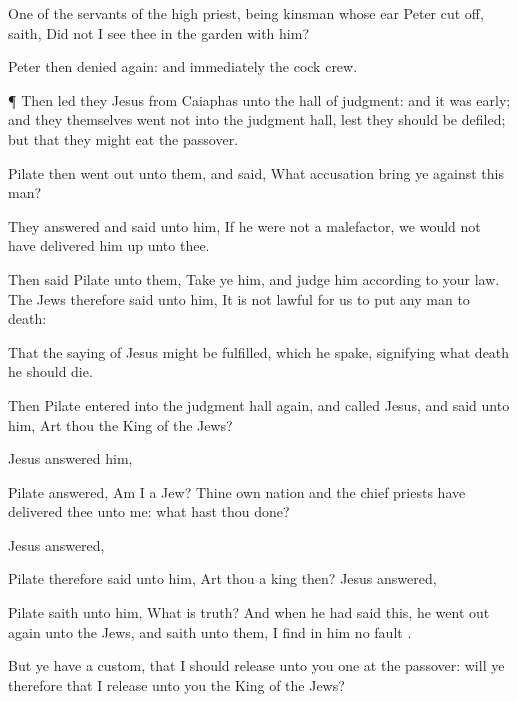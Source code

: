 {One
of the
servants of the high
priest,
being
{}
kinsman
whose
ear
Peter cut
off,
saith,
Did
not
I
see
thee
in the
garden
with
him?

Peter
then
denied
again:
and
immediately the
cock
crew.


\par }{\PP {}¶
Then led
they
Jesus
from
Caiaphas
unto the hall of
judgment:
and it
was
early;
and
they
themselves
went
not
into the judgment
hall,
lest they should be
defiled;
but
that they might
eat the
passover.

Pilate
then went
out
unto
them,
and
said,
What
accusation bring
ye
against
this
man?

They
answered
and
said unto
him,
If
he
were
not a
malefactor, we
would
not have
delivered
him up unto
thee.

Then
said
Pilate unto
them,
Take
ye
him,
and
judge
him according
to
your
law. The
Jews
therefore said
unto
him, It
is
not lawful for
us to
put any
man to
death:

That the
saying of
Jesus might be
fulfilled,
which he
spake,
signifying
what
death he
should
die.

Then
Pilate
entered
into the judgment
hall
again,
and
called
Jesus,
and
said unto
him,
Art
thou the
King of the
Jews?

Jesus
answered
him,
{}

Pilate
answered,
Am
I a
Jew? Thine
own
nation
and the chief
priests have
delivered
thee unto
me:
what hast thou
done?

Jesus
answered,
{}

Pilate
therefore
said unto
him,
Art
thou a
king
then?
Jesus
answered,
{}

Pilate
saith unto
him,
What
is
truth?
And when he had
said
this, he went
out
again
unto the
Jews,
and
saith unto
them,
I
find
in
him
no
fault
{}.

But ye
have a
custom,
that I should
release
unto
you
one
at the
passover: will
ye
therefore that I
release unto
you the
King of the
Jews?

}
